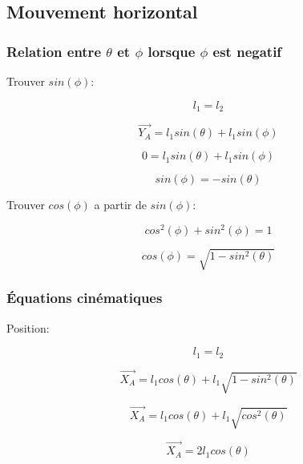 \documentclass{article}
\begin{document}
\subsection{Mouvement horizontal}
\subsubsection{Relation entre $\theta$ et $\phi$ lorsque $\phi$ est negatif}
Trouver $sin(\phi)$:

\begin{equation}
l_1 = l_2
\end{equation}

\begin{equation}
\overrightarrow{Y_A} = l_1sin(\theta)+l_1sin(\phi)
\end{equation}

\begin{equation}
0 = l_1sin(\theta)+l_1sin(\phi)
\end{equation}

\begin{equation}
sin(\phi) = -sin(\theta)
\end{equation}

\noindent Trouver $cos(\phi)$ a partir de $sin(\phi)$:

\begin{equation}
cos^2(\phi)+sin^2(\phi) = 1
\end{equation}

\begin{equation}
cos(\phi) = \sqrt{1-sin^2(\theta)}
\end{equation}

\subsubsection{Équations cinématiques}
Position:

\begin{equation}
l_1 = l_2
\end{equation}

\begin{equation}
\overrightarrow{X_A} = l_1cos(\theta)+l_1\sqrt{1-sin^2(\theta)}
\end{equation}

\begin{equation}
\overrightarrow{X_A} = l_1cos(\theta)+l_1\sqrt{cos^2(\theta)}
\end{equation}

\begin{equation}
\overrightarrow{X_A} = 2l_1cos(\theta)
\end{equation}
\end{document}
